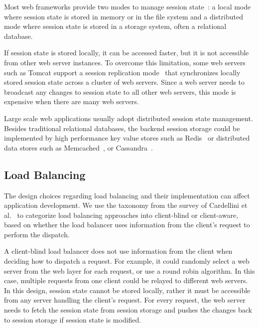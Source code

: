 Most web frameworks provide two modes to manage session
state~\cite{phpdoc,j2eedoc}: a local mode where session state
is stored in memory or in the file system and a distributed mode where
session state is stored in a storage system, often a relational database.

If session state is stored locally, it can be accessed faster, but it is not
accessible from other web server instances.  To overcome this limitation, some
web servers such as Tomcat support a session replication
mode~\cite{tomcatcluster} that  synchronizes locally stored session state
across a cluster of web servers.  Since a web server needs to
broadcast any changes to session state to all other web servers, this mode 
is expensive when there are many web servers.

Large scale web applications usually adopt distributed session state management.
Besides traditional relational databases,
the backend session storage could be implemented by high performance key value
stores such as Redis~\cite{redis} or distributed data stores 
such as Memcached~\cite{fitzpatrick2004distributed}, or 
Cassandra~\cite{lakshman2010cassandra}.

\subsection{Load Balancing}

The design choices regarding load balancing and their implementation can 
affect application development.  We use the taxonomy from the survey of Cardellini et
al.~\cite{cardellini2002state} to categorize load balancing approaches into client-blind 
or client-aware, based on whether the load balancer uses information from
the client's request to perform the dispatch.

A client-blind load balancer does not use information from the client when
deciding how to dispatch a request. For example, it could randomly select a
web server from the web layer for each request, or use a round robin
algorithm. In this case, multiple requests from one client could be relayed to
different web servers. In this design, session state cannot be stored locally,
rather it must be accessible  from any server handling the client's request.
For every request, the web server needs to fetch the session state from
session storage and pushes the changes back to session storage if session
state is modified.

